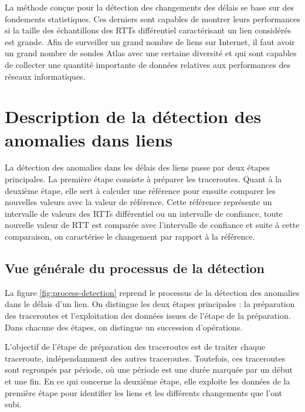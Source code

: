 La méthode conçue pour la détection des changements des délais se base sur des fondements statistiques. Ces derniers sont capables de montrer leurs performances si la taille des échantillons des RTTs différentiel caractérisant un lien considérés est grande.   Afin de surveiller un grand nombre de liens sur Internet, il faut avoir un grand nombre de sondes Atlas avec une certaine diversité et  qui sont capables de collecter une quantité importante de données relatives aux performances des réseaux informatiques.




\section{Description de la détection des anomalies dans liens}

La détection des anomalies dans les délais des liens passe par deux étapes principales. La première étape consiste à préparer les traceroutes. Quant à la deuxième étape, elle sert à calculer une référence pour ensuite comparer les nouvelles valeurs avec la valeur de référence. Cette  référence représente un intervalle de valeurs des RTTs différentiel ou un intervalle de confiance, toute nouvelle valeur de RTT est comparée avec l'intervalle de confiance et suite à cette comparaison, on caractérise le changement par rapport à la référence.  

\subsection{Vue générale du processus de la détection}

 La figure 	\ref{fig:process-detection} reprend le processus de la détection des anomalies dans le délais d'un lien. On distingue les deux étapes principales : la préparation des traceroutes et l'exploitation des données issues de l'étape de la préparation.  Dans chacune des étapes, on distingue un succession d'opérations. 
 
 L'objectif de l'étape de préparation des traceroutes est de traiter chaque traceroute, indépendamment des autres traceroutes. Toutefois, ces traceroutes sont regroupés par période, où une période est une durée marquée par un début et une fin. En ce qui concerne la deuxième étape, elle exploite les données de la première étape pour identifier les liens et les différents changements que l'ont subi.
  

